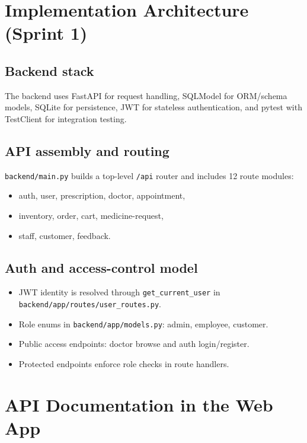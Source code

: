 \documentclass[11pt,a4paper]{article}
\newcommand{\apipath}[1]{\texttt{#1}}
\begin{document}
\section{Implementation Architecture (Sprint 1)}
\subsection{Backend stack}
The backend uses FastAPI for request handling, SQLModel for ORM/schema models, SQLite for persistence, JWT for stateless authentication, and pytest with TestClient for integration testing.

\subsection{API assembly and routing}
\apipath{backend/main.py} builds a top-level \apipath{/api} router and includes 12 route modules:
\begin{itemize}[leftmargin=1.2cm]
  \item auth, user, prescription, doctor, appointment,
  \item inventory, order, cart, medicine-request,
  \item staff, customer, feedback.
\end{itemize}

\subsection{Auth and access-control model}
\begin{itemize}[leftmargin=1.2cm]
  \item JWT identity is resolved through \apipath{get_current_user} in \apipath{backend/app/routes/user_routes.py}.
  \item Role enums in \apipath{backend/app/models.py}: admin, employee, customer.
  \item Public access endpoints: doctor browse and auth login/register.
  \item Protected endpoints enforce role checks in route handlers.
\end{itemize}

\section{API Documentation in the Web App}
\end{document}
